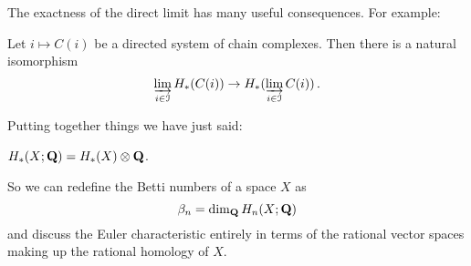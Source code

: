 The exactness of the direct limit has many useful consequences. For example:
\begin{corollary}
Let $i\mapsto C(i)$ be a directed system of chain complexes. 
Then there is a natural isomorphism 
\[
\varinjlim_{i\in\mathcal I} H_*(C(i))\to H_*(\varinjlim_{i\in\mathcal I}C(i))\,.
\]
\end{corollary}
Putting together things we have just said: 
\begin{corollary}
$H_*(X;\mathbf Q)=H_*(X)\otimes\mathbf Q$.
\end{corollary}
So we can redefine the Betti numbers of a space $X$ as 
\[
\beta_n=\dim_\mathbf Q H_n(X;\mathbf Q)
\]
and discuss the Euler characteristic entirely in terms of the rational vector
spaces making up the rational homology of $X$. 







